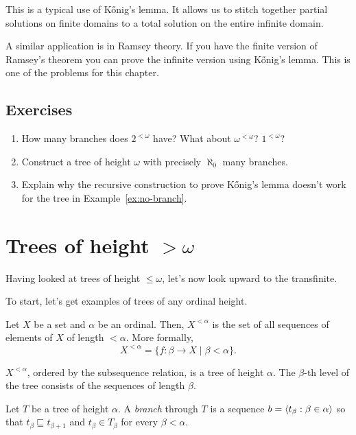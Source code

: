 \documentclass[10pt]{amsart}
\begin{document}
This is a typical use of K\H{o}nig's lemma. It allows us to stitch together partial solutions on finite domains to a total solution on the entire infinite domain. 

A similar application is in Ramsey theory. If you have the finite version of Ramsey's theorem you can prove the infinite version using K\H{o}nig's lemma. This is one of the problems for this chapter. 

\subsection*{Exercises}

\begin{enumerate}
\item How many branches does $2^{<\omega}$ have? What about $\omega^{<\omega}$? $1^{<\omega}$?
\item Construct a tree of height $\omega$ with precisely $\aleph_0$ many branches.
\item Explain why the recursive construction to prove K\H{o}nig's lemma doesn't work for the tree in Example~\ref{ex:no-branch}.
\end{enumerate}

\newpage

\section{Trees of height $>\omega$}

Having looked at trees of height $\le \omega$, let's now look upward to the transfinite. 

To start, let's get examples of trees of any ordinal height.

\begin{definition}
Let $X$ be a set and $\alpha$ be an ordinal. Then, $X^{<\alpha}$ is the set of all sequences of elements of $X$ of length $<\alpha$. More formally,
\[
X^{<\alpha} = \{ f : \beta \to X \mid \beta < \alpha \}.
\]
\end{definition}

\begin{example}
$X^{<\alpha}$, ordered by the subsequence relation, is a tree of height $\alpha$. The $\beta$-th level of the tree consists of the sequences of length $\beta$.
\end{example}

\begin{definition}
Let $T$ be a tree of height $\alpha$. A \emph{branch} through $T$ is a sequence $b = {\left\langle t_\beta : \beta \in \alpha \right\rangle}$ so that $t_\beta \sqsubseteq t_{\beta+1}$ and $t_\beta \in T_\beta$ for every $\beta < \alpha$.
\end{definition}
\end{document}
